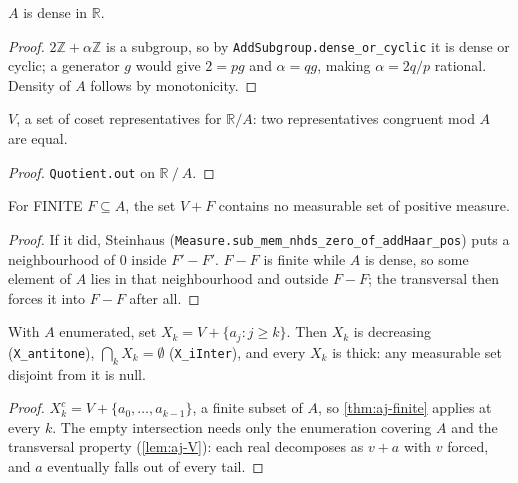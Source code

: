 \begin{lemma}[Density]
\label{lem:aj-dense}
\leanok
{}
$A$ is dense in $\mathbb{R}$.
\end{lemma}

\begin{proof}
\leanok
$2\mathbb{Z}+\alpha\mathbb{Z}$ is a subgroup, so by
\texttt{AddSubgroup.dense\_or\_cyclic} it is dense or cyclic; a generator $g$
would give $2 = pg$ and $\alpha = qg$, making $\alpha = 2q/p$ rational. Density
of $A$ follows by monotonicity.
\end{proof}

\begin{lemma}
\label{lem:aj-V}
\leanok
{}
  $V$, a set of coset representatives for $\mathbb{R}/A$: two representatives
congruent mod $A$ are equal.
\end{lemma}

\begin{proof}
\leanok
\texttt{Quotient.out} on $\mathbb{R} \mathbin{/} A$.
\end{proof}

\begin{theorem}
\label{thm:aj-finite}
\leanok
{}
For FINITE $F \subseteq A$, the set $V + F$ contains no measurable set of
positive measure.
\end{theorem}

\begin{proof}
\leanok
{}
If it did, Steinhaus
(\texttt{Measure.sub\_mem\_nhds\_zero\_of\_addHaar\_pos}) puts a neighbourhood
of $0$ inside $F' - F'$. $F - F$ is finite while $A$ is dense, so some element of
$A$ lies in that neighbourhood and outside $F - F$; the transversal then forces
it into $F - F$ after all.
\end{proof}

\begin{theorem}
\label{thm:aj-tower}
\leanok
{}
With $A$ enumerated, set $X_k = V + \{a_j : j \geq k\}$. Then $X_k$ is
decreasing (\texttt{X\_antitone}), $\bigcap_k X_k = \emptyset$
(\texttt{X\_iInter}), and every $X_k$ is thick: any measurable set disjoint from
it is null.
\end{theorem}

\begin{proof}
\leanok
{}
$X_k^c = V + \{a_0,\dots,a_{k-1}\}$, a finite subset of $A$, so
\ref{thm:aj-finite} applies at every $k$. The empty intersection needs only
the enumeration covering $A$ and the transversal property
(\ref{lem:aj-V}): each real decomposes as $v + a$ with $v$ forced, and $a$
eventually falls out of every tail.
\end{proof}

